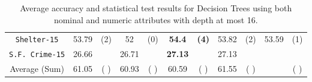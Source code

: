 \begin{table}
\begin{tabular}{c|cc|cc|cc|cc|cc}
{\tt Shelter-15}     &  53.79         &  (2)              &  52         &  (0)          &  {\bf 54.4}  &  {\bf (4)}         &  53.82      & (2)            & 53.59        & (1)       \\   
{\tt S.F. Crime-15}  &  26.66         &                   &  26.71      &               &  {\bf 27.13} &                    &  27.13      &                &              &           \\
\hline
Average (Sum)        &  61.05         &  ( )              & 60.93       &  ( )          &   60.59      &  (  )              &  61.55      & (  )           &              & ( )

\end{tabular}
\caption{Average accuracy and statistical test results for  Decision Trees using both nominal and numeric attributes with depth at most 16.}
\label{exp:numeric-16}
\normalsize
\end{table}

